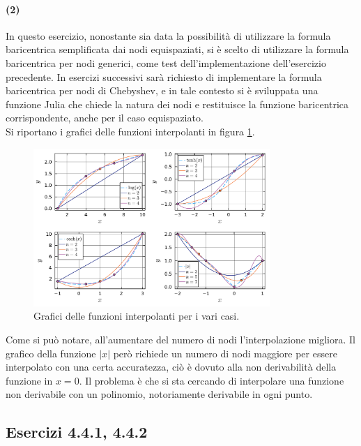 \documentclass[letterpaper, 12pt]{article}
\numberwithin{equation}{section}    %
\begin{document}
\paragraph{(2) } In questo esercizio, nonostante sia data la possibilità di utilizzare la formula baricentrica
semplificata dai nodi equispaziati, si è scelto di utilizzare la formula baricentrica per nodi generici, come
test dell'implementazione dell'esercizio precedente. In esercizi successivi sarà richiesto di implementare
la formula baricentrica per nodi di Chebyshev, e in tale contesto si è sviluppata una funzione Julia che
chiede la natura dei nodi e restituisce la funzione baricentrica corrispondente, anche per il caso equispaziato. \\
Si riportano i grafici delle funzioni interpolanti in figura \ref{fig:es4_2_2_1}.
\begin{figure}[!ht]
    \centering
    \includegraphics[width=0.8\textwidth]{4221.pdf}
    \caption{Grafici delle funzioni interpolanti per i vari casi.}
    \label{fig:es4_2_2_1}
\end{figure}

Come si può notare, all'aumentare del numero di nodi l'interpolazione migliora. Il grafico della funzione $|x|$
però richiede un numero di nodi maggiore per essere interpolato con una certa accuratezza, ciò è dovuto alla
non derivabilità della funzione in $x=0$. Il problema è che si sta cercando di interpolare una funzione
non derivabile con un polinomio, notoriamente derivabile in ogni punto.

\subsection{Esercizi 4.4.1, 4.4.2}
\end{document}

